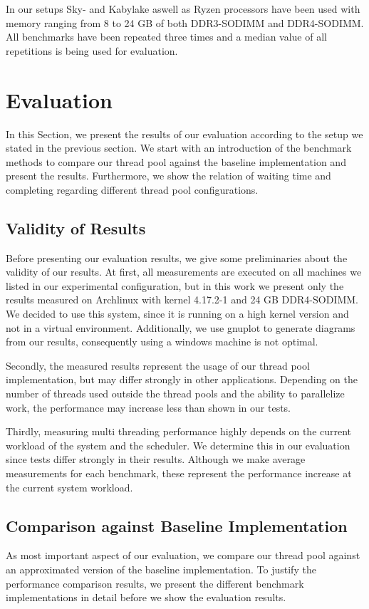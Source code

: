\documentclass[conference]{IEEEtran}
\begin{document}
In our setups Sky- and Kabylake aswell as Ryzen processors have been used with memory
ranging from 8 to 24 GB of both DDR3-SODIMM and DDR4-SODIMM. 
All benchmarks have been repeated three times and a median value of all
repetitions is being used for evaluation.

\section{Evaluation}
In this Section, we present the results of our evaluation according to the setup we stated in the previous section. We start with an introduction of the benchmark methods to compare our thread pool against the baseline implementation and present the results. Furthermore, we show the relation of waiting time and completing regarding different thread pool configurations.

\subsection{Validity of Results}
Before presenting our evaluation results, we give some preliminaries about the validity of our results. At first, all measurements are executed on all machines we listed in our experimental configuration, but in this work we present only the results measured on Archlinux with kernel 4.17.2-1 and 24 GB DDR4-SODIMM. We decided to use this system, since it is running on a high kernel version and not in a virtual environment. Additionally, we use gnuplot to generate diagrams from our results, consequently using a windows machine is not optimal.

Secondly, the measured results represent the usage of our thread pool implementation, but may differ strongly in other applications. Depending on the number of threads used outside the thread pools and the ability to parallelize work, the performance may increase less than shown in our tests.

Thirdly, measuring multi threading performance highly depends on the current workload of the system and the scheduler. We determine this in our evaluation since tests differ strongly in their results. Although we make average measurements for each benchmark, these represent the performance increase at the current system workload.

\subsection{Comparison against Baseline Implementation}
As most important aspect of our evaluation, we compare our thread pool against an approximated version of the baseline implementation. To justify the performance comparison results, we present the different benchmark implementations in detail before we show the evaluation results.
\end{document}
